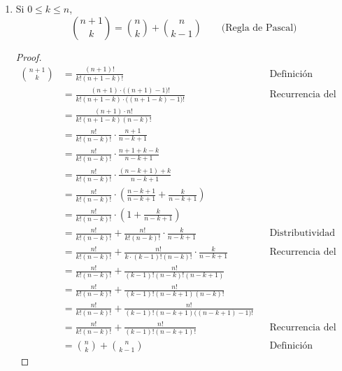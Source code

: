 \begin{enumerate}[label=\alph*)]
  \item Si $0\leq k \leq n$, \[\binom{n+1}{k} = \binom{n}{k} + \binom{n}{k-1} \qquad \text{(Regla de Pascal)}\]
  \begin{proof}\leavevmode
    \begin{align*}
    \binom{n+1}{k} &= \frac{(n+1)!}{k!(n+1-k)!} && \text{Definición}\\
    &= \frac{(n+1)\cdot \big((n+1)-1\big)!}{k!(n+1-k)\cdot \big((n+1-k)-1\big)!} && \text{Recurrencia del factorial}\\
    &= \frac{(n+1)\cdot n!}{k!(n+1-k)(n-k)!}\\
    &= \frac{n!}{k! (n-k)!} \cdot \frac{n+1}{n-k+1} \\
    &= \frac{n!}{k! (n-k)!} \cdot \frac{n+1+k-k}{n-k+1} \\
    &= \frac{n!}{k! (n-k)!} \cdot \frac{(n-k+1)+k}{n-k+1} \\
    &= \frac{n!}{k!(n-k)!}\cdot \left(\frac{n-k+1}{n-k+1}+\frac{k}{n-k+1}\right) \\
    &= \frac{n!}{k!(n-k)!} \cdot \left(1+\frac{k}{n-k+1}\right) \\
    &= \frac{n!}{k!(n-k)!} + \frac{n!}{k!(n-k)!}\cdot \frac{k}{n-k+1} && \text{Distributividad}\\
    &= \frac{n!}{k!(n-k)!} + \frac{n!}{k\cdot (k-1)!(n-k)!}\cdot \frac{k}{n-k+1} && \text{Recurrencia del factorial}\\
    &= \frac{n!}{k!(n-k)!} + \frac{n!}{(k-1)!(n-k)!(n-k+1)}\\
    &= \frac{n!}{k!(n-k)!} + \frac{n!}{(k-1)!(n-k+1)(n-k)!}\\
    &= \frac{n!}{k!(n-k)!} + \frac{n!}{(k-1)!(n-k+1)\big((n-k+1)-1\big)!}\\
    &= \frac{n!}{k!(n-k)!} + \frac{n!}{(k-1)!(n-k+1)!} && \text{Recurrencia del factorial}\\
    &= \binom{n}{k} + \binom{n}{k-1} && \text{Definición}
    \end{align*}
  \end{proof}
  

\end{enumerate}
